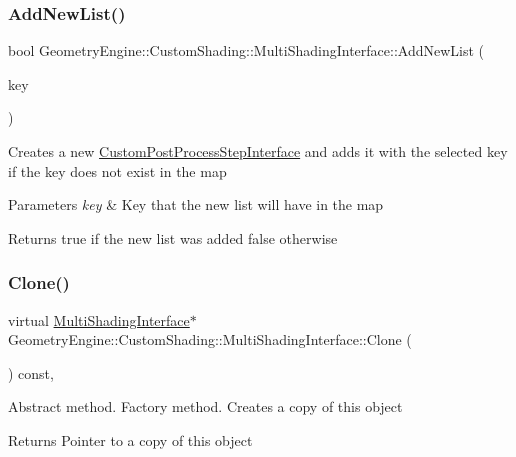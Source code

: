 \subsubsection{\texorpdfstring{AddNewList()}{AddNewList()}}
{\footnotesize\ttfamily bool Geometry\+Engine\+::\+Custom\+Shading\+::\+Multi\+Shading\+Interface\+::\+Add\+New\+List (\begin{DoxyParamCaption}\item[{\mbox{\hyperlink{namespace_geometry_engine_1_1_custom_shading_a9bfcbfb6d734e4d6fb8e2c661b987db6}{Shading\+Lists}}}]{key }\end{DoxyParamCaption})}

Creates a new \mbox{\hyperlink{class_geometry_engine_1_1_custom_shading_1_1_custom_post_process_step_interface}{Custom\+Post\+Process\+Step\+Interface}} and adds it with the selected key if the key does not exist in the map 
\begin{DoxyParams}{Parameters}
{\em key} & Key that the new list will have in the map \\
\hline
\end{DoxyParams}
\begin{DoxyReturn}{Returns}
true if the new list was added false otherwise 
\end{DoxyReturn}
\mbox{\label{class_geometry_engine_1_1_custom_shading_1_1_multi_shading_interface_a955a95997739744dc1f4553e018c5675}} 
\subsubsection{\texorpdfstring{Clone()}{Clone()}}
{\footnotesize\ttfamily virtual \mbox{\hyperlink{class_geometry_engine_1_1_custom_shading_1_1_multi_shading_interface}{Multi\+Shading\+Interface}}$\ast$ Geometry\+Engine\+::\+Custom\+Shading\+::\+Multi\+Shading\+Interface\+::\+Clone (\begin{DoxyParamCaption}{ }\end{DoxyParamCaption}) const\hspace{0.3cm}{\ttfamily [inline]}, {\ttfamily [virtual]}}

Abstract method. Factory method. Creates a copy of this object \begin{DoxyReturn}{Returns}
Pointer to a copy of this object 
\end{DoxyReturn}
\mbox{\label{class_geometry_engine_1_1_custom_shading_1_1_multi_shading_interface_afee05bccc3a80cd62df3f71c119bc074}} 
